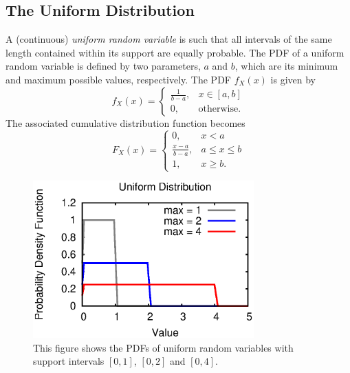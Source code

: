 \subsection{The Uniform Distribution}

A (continuous) \emph{uniform random variable} is such that all intervals of the same length contained within its support are equally probable. 
The PDF of a uniform random variable is defined by two parameters, $a$ and $b$, which are its minimum and maximum possible values, respectively.
The PDF $f_X(x)$ is given by
\begin{equation*}
f_X(x) = \begin{cases} \frac{1}{b-a}, & x \in [a, b] \\
0, & \text{otherwise}. \end{cases}
\end{equation*}
The associated cumulative distribution function becomes
\begin{equation*}
F_X(x) = \begin{cases} 0, & x < a \\
\frac{x-a}{b-a}, & a \leq x \leq b \\
1, & x \geq b . \end{cases}
\end{equation*}

\begin{figure}[ht]
\begin{center}
\includegraphics[width=8.5cm]{Figures/8chapter/uniform_pdf}
\end{center}
\caption{This figure shows the PDFs of uniform random variables with support intervals $[0,1]$, $[0,2]$ and $[0,4]$.}
\end{figure}

